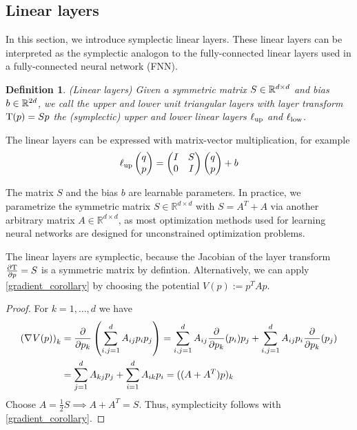 \documentclass[twoside,a4paper]{article}
\newtheorem{definition}{Definition}
\begin{document}
\subsection{Linear layers}
In this section, we introduce symplectic linear layers. These linear layers can be interpreted 
as the symplectic analogon to the fully-connected linear layers used in a fully-connected
neural network (FNN).

\begin{definition}\label{def_linear_layer}
	(Linear layers)
	Given a symmetric matrix $S \in \mathbb{R}^{d \times d}$ and bias $b \in \mathbb{R}^{2d}$,
	we call the upper and lower unit triangular layers
	with layer transform $\mathrm{T}(p) = Sp$ the (symplectic) upper and lower 
	linear layers $\ell_{\text{up}}$ and $\ell_{\text{low}}$.
\end{definition}

The linear layers can be expressed with matrix-vector multiplication, for example
\begin{equation*}
	\ell_{\text{up}} \begin{pmatrix} q \\ p \end{pmatrix} = \begin{pmatrix}
		I & S \\
		0 & I
	\end{pmatrix} \begin{pmatrix} q \\ p \end{pmatrix} + b
\end{equation*}

The matrix $S$ and the bias $b$ are learnable parameters.
In practice, we parametrize the symmetric matrix $S\in \mathbb{R}^{d \times d}$
with $S = A^T + A$ via another arbitrary matrix $A\in \mathbb{R}^{d \times d}$, as
most optimization methods used for learning neural networks are designed for
unconstrained optimization problems.

The linear layers are symplectic, because the Jacobian of the layer transform $\frac{\partial \mathrm{T}}{\partial p} = S$
is a symmetric matrix by defintion. Alternatively, we can apply \cref{gradient_corollary} by
choosing the potential $V(p) := p^TAp$.

\begin{proof}
	For $k=1, \dots, d$ we have
	\begin{align*}
		\left( \nabla_{}{V}(p) \right)_k &= \frac{\partial }{\partial p_k} \left( \sum_{i,j=1}^d A_{ij} p_i p_j \right)
		= \sum_{i,j=1}^d A_{ij} \frac{\partial }{\partial p_k}(p_i) p_j + \sum_{i,j=1}^d A_{ij} p_i \frac{\partial }{\partial p_k}(p_j) \\
		&= \sum_{j=1}^d A_{kj} p_j + \sum_{i=1}^d A_{ik} p_i = ((A+A^T)p)_k \\
	\end{align*}
	Choose $A=\frac{1}{2}S \implies A+A^T=S$.
	Thus, symplecticity follows with \cref{gradient_corollary}.
\end{proof}
\end{document}
